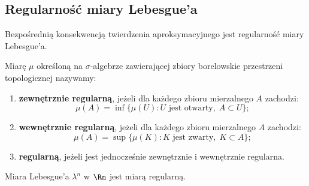 \subsection{Regularność miary Lebesgue'a}

Bezpośrednią konsekwencją twierdzenia aproksymacyjnego jest regularność miary Lebesgue'a.

\begin{defi}
    Miarę $\mu$ określoną na $\sigma$-algebrze zawierającej zbiory borelowskie przestrzeni topologicznej nazywamy:
    \begin{enumerate}
        \item \textbf{zewnętrznie regularną}, jeżeli dla każdego zbioru mierzalnego $A$ zachodzi:
              \begin{equation*}
                  \mu(A) = \inf \{\mu(U) \colon U \text{ jest otwarty}, \; A \subset U\};
              \end{equation*}
        \item \textbf{wewnętrznie regularną}, jeżeli dla każdego zbioru mierzalnego $A$ zachodzi:
              \begin{equation*}
                  \mu(A) = \sup \{\mu(K) \colon K \text{ jest zwarty}, \; K \subset A\};
              \end{equation*}
        \item \textbf{regularną}, jeżeli jest jednocześnie zewnętrznie i wewnętrznie regularna.
    \end{enumerate}
\end{defi}

\begin{tw}
    Miara Lebesgue'a $\lambda^n$ w $\Rn$ jest miarą regularną.
\end{tw}

